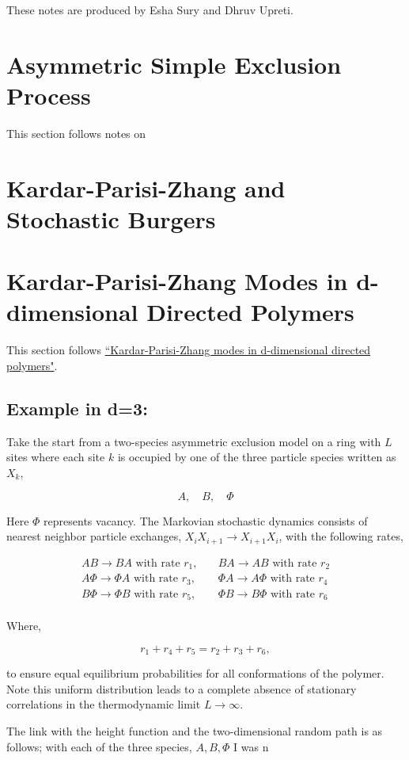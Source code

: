 \documentclass{article}
\begin{document}
These notes are produced by Esha Sury and Dhruv Upreti.

\section{Asymmetric Simple Exclusion Process}

This section follows notes on 

\section{Kardar-Parisi-Zhang and Stochastic Burgers}

\section{Kardar-Parisi-Zhang Modes in d-dimensional Directed Polymers}

This section follows \href{https://www.math.purdue.edu/~ebkaufma/PhysRevE.96.032119.pdf}{``Kardar-Parisi-Zhang modes in d-dimensional directed polymers"}. 


\subsection{Example in d=3:}

Take the start from a two-species asymmetric exclusion model on a ring with $L$ sites where each site $k$ is occupied by one of the three particle species written as $X_k$,

\[A, \quad B, \quad \Phi\]

Here $\Phi$ represents vacancy. The Markovian stochastic dynamics consists of nearest neighbor particle exchanges, $X_i X_{i+1} \to X_{i+1} X_{i}$, with the following rates,

\begin{align*}
    AB \to BA \text{ with rate $r_1$},& \quad BA \to AB \text{ with rate $r_2$} \\
    A \Phi \to \Phi A \text{ with rate $r_3$}, & \quad \Phi A \to A \Phi \text{ with rate $r_4$} \\
    B \Phi \to \Phi B \text{ with rate $r_5$}, & \quad \Phi B \to B \Phi \text{ with rate $r_6$} \\
\end{align*}

Where, 

\[r_1+r_4+r_5 = r_2+r_3+r_6,\]

to ensure equal equilibrium probabilities for all conformations of the polymer. Note this uniform distribution leads to a complete absence of stationary correlations in the thermodynamic limit $L\to\infty$. %

The link with the height function and the two-dimensional random path is as follows; with each of the three species, $A, B, \Phi$ I was n
\end{document}
